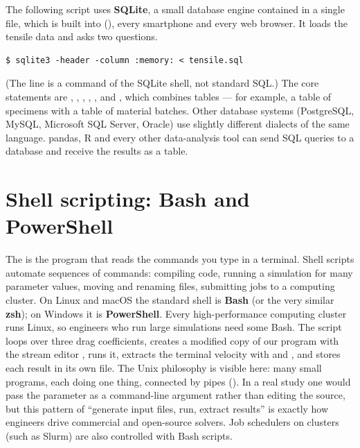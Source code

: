 The following script uses \textbf{SQLite}, a small database engine contained in a single
file, which is built into \py (), every smartphone and every web
browser. It loads the tensile data and asks two questions.
\begin{lstlisting}[style=shell]
$ sqlite3 -header -column :memory: < tensile.sql
\end{lstlisting}
(The  line is a command of the SQLite shell, not standard SQL.) The core
statements are ,
, , , , and , which
combines tables --- for example, a table of specimens with a table of material batches.
Other database systems (PostgreSQL, MySQL, Microsoft SQL Server, Oracle) use slightly
different dialects of the same language. pandas, R and every other data-analysis tool can
send SQL queries to a database and receive the results as a table.

\section{Shell scripting: Bash and PowerShell}

The  is the program that reads the commands you type in a terminal. Shell
scripts automate sequences of commands: compiling code, running a simulation for many
parameter values, moving and renaming files, submitting jobs to a computing cluster. On
Linux and macOS the standard shell is \textbf{Bash} (or the very similar \textbf{zsh});
on Windows it is \textbf{PowerShell}. Every high-performance computing cluster runs Linux,
so engineers who run large simulations need some Bash.
The script loops over three drag coefficients, creates a modified copy of our \py
program with the stream editor , runs it, extracts the terminal velocity with
 and , and stores each result in its own file. The Unix philosophy is
visible here: many small programs, each doing one thing, connected by pipes (\code{|}).
In a real study one would pass the parameter as a command-line argument rather than editing
the source, but this pattern of ``generate input files, run, extract results'' is exactly
how engineers drive commercial and open-source solvers. Job schedulers on clusters (such as
Slurm) are also controlled with Bash scripts.

